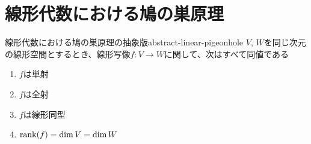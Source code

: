 \documentclass[../../../topic_linear-algebra]{subfiles}
\begin{document}
\sectionline
\section{線形代数における鳩の巣原理}

\begin{theorem}{線形代数における鳩の巣原理の抽象版}{abstract-linear-pigeonhole}
  $V,\,W$を同じ次元の線形空間とするとき、線形写像$f\colon V \to W$に関して、次はすべて同値である
  \begin{enumerate}[label=\romanlabel]
    \item $f$は単射
    \item $f$は全射
    \item $f$は線形同型
    \item $\rank(f) = \dim V = \dim W$
  \end{enumerate}
\end{theorem}
\end{document}
